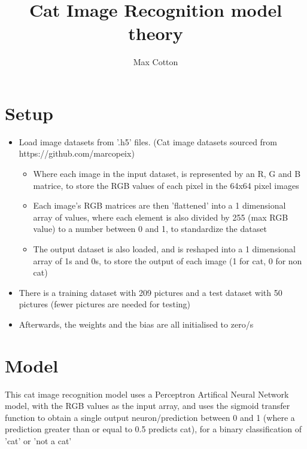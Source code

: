 \documentclass[10pt,a4paper]{article}
\title{Cat Image Recognition model theory}
\author{Max Cotton}
\date{}
\begin{document}
\maketitle

\section{Setup}

\begin{itemize}
    \item Load image datasets from '.h5' files. (Cat image datasets sourced from https://github.com/marcopeix)
    \begin{itemize}
        \item Where each image in the input dataset, is represented by an R, G and B matrice, to store the RGB values of each pixel in the 64x64 pixel images
        \item Each image's RGB matrices are then 'flattened' into a 1 dimensional array of values, where each element is also divided by 255 (max RGB value) to a number between 0 and 1, to standardize the dataset
        \item The output dataset is also loaded, and is reshaped into a 1 dimensional array of 1s and 0s, to store the output of each image (1 for cat, 0 for non cat)
    \end{itemize}
    \item There is a training dataset with 209 pictures and a test dataset with 50 pictures (fewer pictures are needed for testing)
    \item Afterwards, the weights and the bias are all initialised to zero/s
\end{itemize}

\section{Model}
This cat image recognition model uses a Perceptron Artifical Neural Network model, with the RGB values as the input array, and uses the sigmoid transfer function to obtain a single output neuron/prediction between 0 and 1 (where a prediction greater than or equal to 0.5 predicts cat), for a binary classification of 'cat' or 'not a cat'
\end{document}
